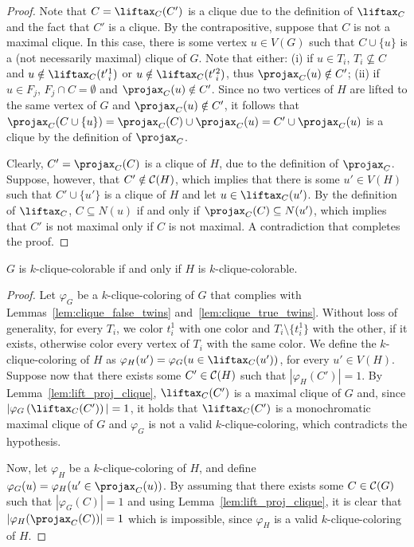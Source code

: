 \begin{proof}
    Note that $C = \Lift{C}(C')$ is a clique due to the definition of $\Lift{C}$ and the fact that $C'$ is a clique.
    By the contrapositive, suppose that $C$ is not a maximal clique.
    In this case, there is some vertex $u \in V(G)$ such that $C \cup \{u\}$ is a (not necessarily maximal) clique of $G$. Note that either:
    (i) if $u \in T_i$, $T_i \nsubseteq C$ and $u \notin \Lift{C}(t'{_i^1})$ or $u \notin \Lift{C}(t'{_i^2})$, thus $\Proj{C}(u) \notin C'$;
    (ii) if $u \in F_j$, $F_j \cap C = \emptyset$ and $\Proj{C}(u) \notin C'$.
    Since no two vertices of $H$ are lifted to the same vertex of $G$ and $\Proj{C}(u) \notin C'$, it follows that  $\Proj{C}(C \cup \{u\}) = \Proj{C}(C) \cup \Proj{C}(u) = C' \cup \Proj{C}(u)$ is a clique by the definition of $\Proj{C}$.
    
    Clearly, $C' = \Proj{C}(C)$ is a clique of $H$, due to the definition of $\Proj{C}$.
    Suppose, however, that $C' \notin \mathcal{C}(H)$, which implies that there is some $u' \in V(H)$ such that $C' \cup \{u'\}$ is a clique of $H$ and let $u \in \Lift{C}(u')$.
    By the definition of $\Lift{C}$, $C \subseteq N(u)$ if and only if $\Proj{C}(C) \subseteq N(u')$, which implies that $C'$ is not maximal only if $C$ is not maximal.
    A contradiction that completes the proof.
\end{proof}

\begin{theorem}
    \label{thm:projected_clique_coloring}
     $G$ is $k$-clique-colorable if and only if $H$ is $k$-clique-colorable.
\end{theorem}

\begin{proof}
    Let $\varphi_G$ be a $k$-clique-coloring of $G$ that complies with Lemmas~\ref{lem:clique_false_twins} and~\ref{lem:clique_true_twins}.
    Without loss of generality, for every $T_i$, we color $t_i^1$ with one color and $T_i \setminus \{t_i^1\}$ with the other, if it exists, otherwise color every vertex of $T_i$ with the same color.
    We define the $k$-clique-coloring of $H$ as $\varphi_H(u') = \varphi_G(u \in \Lift{C}(u'))$, for every $u' \in V(H)$.
    Suppose now that there exists some $C' \in \mathcal{C}(H)$ such that $|\varphi_H(C')| = 1$.
    By Lemma~\ref{lem:lift_proj_clique}, $\Lift{C}(C')$ is a maximal clique of $G$ and, since $|\varphi_G\left(\Lift{C}(C')\right)| = 1$, it holds that $\Lift{C}(C')$ is a monochromatic maximal clique of $G$ and $\varphi_G$ is not a valid $k$-clique-coloring, which contradicts the hypothesis.
        
    Now, let $\varphi_H$ be a $k$-clique-coloring of $H$, and define $\varphi_G(u) = \varphi_H(u' \in \Proj{C}(u))$.
    By assuming that there exists some $C \in \mathcal{C}(G)$ such that $\left|\varphi_G(C)\right| = 1$ and using Lemma~\ref{lem:lift_proj_clique}, it is clear that $\left|\varphi_H(\Proj{C}(C))\right| = 1$ which is impossible, since $\varphi_H$ is a valid $k$-clique-coloring of $H$.
\end{proof}

